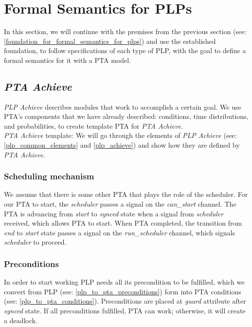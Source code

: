 \chapter{Formal Semantics for PLPs}
In this section, we will continue with the premises from the previous section (see: \ref{foundation_for_formal_semantics_for_plps}) and use the established foundation, to follow specifications of each type of PLP, with the goal to define a formal semantics for it with a PTA model.\\
\section{\textit{PTA Achieve}}
\textit{PLP Achieve} describes modules that work to accomplish a certain goal. We use PTA’s components that we have already described: conditions, time distributions, and probabilities, to create template PTA for \textit{PTA Achieve}. \\
\textit{PTA Achieve} template:  We will go through the elements of \textit{PLP Achieve} (see: \ref{plp_common_elements} and \ref{plp_achieve}) and show how they are defined by \textit{PTA Achieve}.\\
\subsection{Scheduling mechanism \label{pta_achieve_scheduling_mechanism}}
We assume that there is some other PTA that plays the role of the scheduler. For our PTA to start, the\textit{ scheduler }passes a signal on the \textcolor{ColorUppaalChannel}{\textit{can_start}} channel. The PTA is advancing from \textcolor{ColorUppaalState}{\textit{start}} to \textcolor{ColorUppaalState}{\textit{synced}} state when a signal from\textit{ scheduler }received, which allows PTA to start. When PTA completed, the transition from \textcolor{ColorUppaalState}{\textit{end}} to \textcolor{ColorUppaalState}{\textit{start}} state passes a signal on the \textcolor{ColorUppaalChannel}{\textit{run_scheduler}} channel, which signals\textit{ scheduler }to proceed.\\
\subsection{Preconditions \label{pta_achieve_preconditions}}
In order to start working PLP needs all its precondition to be fulfilled, which we convert from PLP (see: \ref{plp_to_pta_preconditions}) form into PTA conditions (see: \ref{plp_to_pta_conditions}). Preconditions are placed at \textit{guard} attribute after \textcolor{ColorUppaalState}{\textit{synced}} state. If all preconditions fulfilled, PTA can work; otherwise, it will create a deadlock.\\
